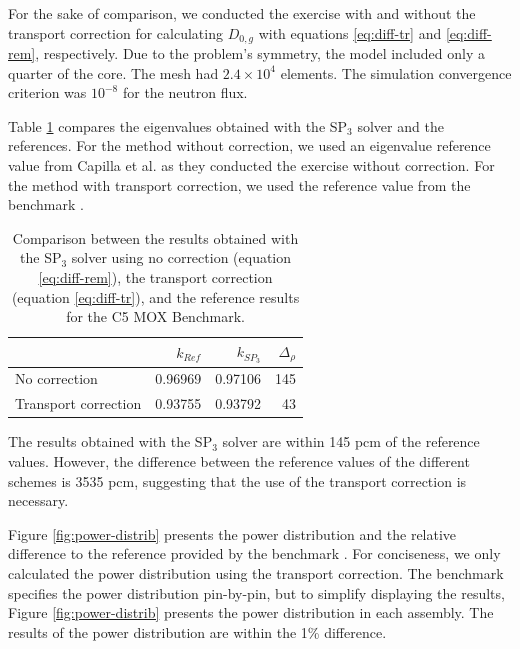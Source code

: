 \documentclass{anstrans}
\begin{document}
For the sake of comparison, we conducted the exercise with and without the transport correction for calculating $D_{0,g}$ with equations \ref{eq:diff-tr} and \ref{eq:diff-rem}, respectively.
Due to the problem's symmetry, the model included only a quarter of the core.
The mesh had $2.4 \times 10^{4}$ elements.
The simulation convergence criterion was $10^{-8}$ for the neutron flux.

Table \ref{tab:keff-2nd} compares the eigenvalues obtained with the SP$_3$ solver and the references.
For the method without correction, we used an eigenvalue reference value from Capilla et al. \cite{capilla_applications_2009} as they conducted the exercise without correction.
For the method with transport correction, we used the reference value from the benchmark \cite{cavarec_benchmark_1994}.
\begin{table}[htbp!]
	\centering
	\caption{Comparison between the results obtained with the SP$_3$ solver using no correction (equation \ref{eq:diff-rem}), the transport correction (equation \ref{eq:diff-tr}), and the reference results for the C5 MOX Benchmark.}
	\label{tab:keff-2nd}
	\begin{tabular}{lrrr}
	\toprule
							& $k_{Ref}$ & $k_{SP_3}$	& $\Delta_{\rho}$	\\
	\midrule
	No correction			& 0.96969	& 0.97106		& 145				\\
	Transport correction	& 0.93755	& 0.93792		& 43				\\
	\bottomrule
	\end{tabular}
\end{table}

The results obtained with the SP$_3$ solver are within 145 pcm of the reference values.
However, the difference between the reference values of the different schemes is 3535 pcm, suggesting that the use of the transport correction is necessary.






Figure \ref{fig:power-distrib} presents the power distribution and the relative difference to the reference provided by the benchmark \cite{cavarec_benchmark_1994}.
For conciseness, we only calculated the power distribution using the transport correction.
The benchmark specifies the power distribution pin-by-pin, but to simplify displaying the results, Figure \ref{fig:power-distrib} presents the power distribution in each assembly.
The results of the power distribution are within the 1\% difference.
\end{document}
